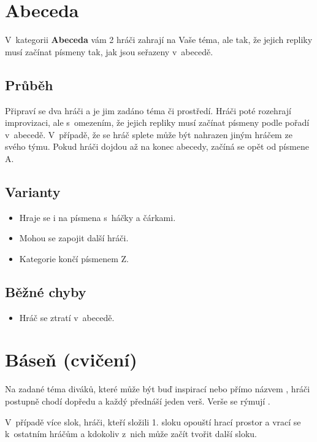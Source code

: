 \needspace{5cm} \section{Abeceda} \label{abeceda}  
 
V~kategorii \textbf{Abeceda} vám 2 hráči zahrají na Vaše téma, ale tak, že jejich repliky musí začínat písmeny tak, jak jsou seřazeny v~abecedě. 
 
\subsection{Průběh} Připraví se dva hráči a je jim zadáno téma či prostředí. Hráči poté rozehrají improvizaci, ale s~omezením, že jejich repliky musí začínat písmeny podle pořadí v~abecedě. V~případě, že se hráč splete může být nahrazen jiným hráčem ze svého týmu. Pokud hráči dojdou až na konec abecedy, začíná se opět od písmene A. 
 
\subsection{ Varianty } \begin{itemize}
\item  Hraje se i na písmena s~háčky a čárkami.
\item  Mohou se zapojit další hráči.
\item  Kategorie končí písmenem Z.
\end{itemize}
 
\subsection{ Běžné chyby } \begin{itemize}
\item Hráč se ztratí v~abecedě.
\end{itemize}
 
 
 
 
 
\needspace{5cm} \section{Báseň (cvičení)} \label{báseň (cvičení)} Na zadané téma diváků, které může být buď inspirací nebo přímo názvem , hráči postupně chodí dopředu a každý přednáší  
jeden verš. Verše se rýmují . 
 
V~případě více slok, hráči, kteří složili 1. sloku opouští hrací prostor a vrací se k~ostatním hráčům a kdokoliv z~nich může začít tvořit 
další sloku. 
 
